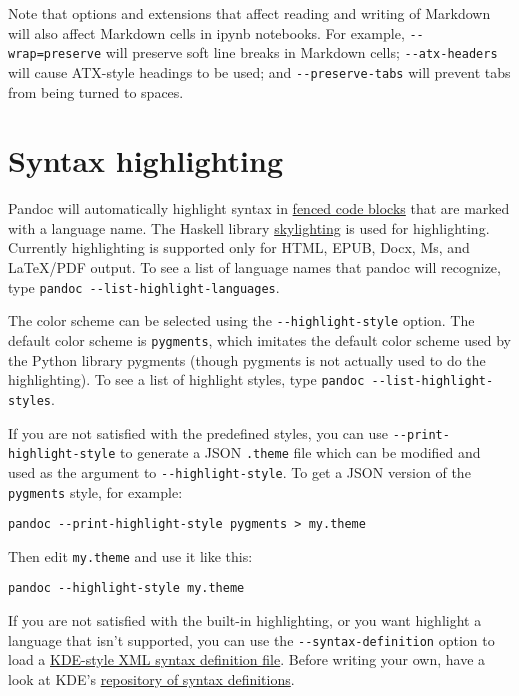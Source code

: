 \documentclass[]{article}
\begin{document}
Note that options and extensions that affect reading and writing of
Markdown will also affect Markdown cells in ipynb notebooks. For
example, \texttt{-\/-wrap=preserve} will preserve soft line breaks in
Markdown cells; \texttt{-\/-atx-headers} will cause ATX-style headings
to be used; and \texttt{-\/-preserve-tabs} will prevent tabs from being
turned to spaces.

\hypertarget{syntax-highlighting}{%
\section{Syntax highlighting}\label{syntax-highlighting}}

Pandoc will automatically highlight syntax in
\protect\hyperlink{fenced-code-blocks}{fenced code blocks} that are
marked with a language name. The Haskell library
\href{https://github.com/jgm/skylighting}{skylighting} is used for
highlighting. Currently highlighting is supported only for HTML, EPUB,
Docx, Ms, and LaTeX/PDF output. To see a list of language names that
pandoc will recognize, type
\texttt{pandoc\ -\/-list-highlight-languages}.

The color scheme can be selected using the \texttt{-\/-highlight-style}
option. The default color scheme is \texttt{pygments}, which imitates
the default color scheme used by the Python library pygments (though
pygments is not actually used to do the highlighting). To see a list of
highlight styles, type \texttt{pandoc\ -\/-list-highlight-styles}.

If you are not satisfied with the predefined styles, you can use
\texttt{-\/-print-highlight-style} to generate a JSON \texttt{.theme}
file which can be modified and used as the argument to
\texttt{-\/-highlight-style}. To get a JSON version of the
\texttt{pygments} style, for example:

\begin{verbatim}
pandoc --print-highlight-style pygments > my.theme
\end{verbatim}

Then edit \texttt{my.theme} and use it like this:

\begin{verbatim}
pandoc --highlight-style my.theme
\end{verbatim}

If you are not satisfied with the built-in highlighting, or you want
highlight a language that isn't supported, you can use the
\texttt{-\/-syntax-definition} option to load a
\href{https://docs.kde.org/stable5/en/applications/katepart/highlight.html}{KDE-style
XML syntax definition file}. Before writing your own, have a look at
KDE's
\href{https://github.com/KDE/syntax-highlighting/tree/master/data/syntax}{repository
of syntax definitions}.
\end{document}
